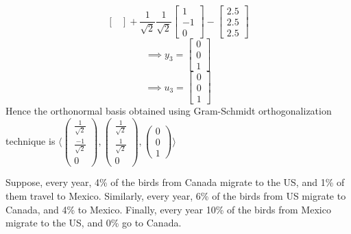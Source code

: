 \documentclass[solution,addpoints,12pt]{exam}
\newenvironment{Solution}{\begin{solution}}{\end{solution}}
\begin{document}
\begin{questions}
\begin{parts}
\begin{Solution}
\[\begin{bmatrix}
    \end{bmatrix} + \frac{1}{\sqrt{2}}\frac{1}{\sqrt{2}}\begin{bmatrix}
        1 \\ -1 \\ 0
    \end{bmatrix} - \begin{bmatrix}
        2.5 \\ 2.5 \\ 2.5
    \end{bmatrix}\]
    \[\implies y_{3} = \begin{bmatrix}
        0 \\ 0 \\ 1
    \end{bmatrix}\]
    \[\implies u_{3} = \begin{bmatrix}
        0 \\ 0 \\ 1
    \end{bmatrix}\]
    Hence the orthonormal basis obtained using Gram-Schmidt orthogonalization technique is  $
        \langle \left( \begin{array}{cc}
         \frac{1}{\sqrt{2}} \\ \frac{-1}{\sqrt{2}} \\ 0
    \end{array} \right), \left( \begin{array}{cc}
         \frac{1}{\sqrt{2}} \\ \frac{1}{\sqrt{2}} \\ 0
    \end{array} \right),
    \left( \begin{array}{cc}
         0 \\ 0 \\ 1
    \end{array} \right)
    \rangle
    $
    \end{Solution}


    
\end{parts}

\question Suppose, every year, 4\% of the birds from Canada migrate to the US, and 1\% of them travel to Mexico. Similarly, every year, 6\% of the birds from US migrate to Canada, and 4\% to Mexico. Finally, every year 10\% of the birds from Mexico migrate to the US, and 0\% go to Canada.
\begin{parts}

\end{parts}
\end{questions}
\end{document}
